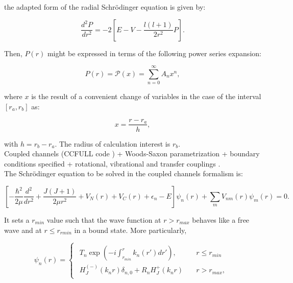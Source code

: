 \documentclass[openany]{book}
\begin{document}
the adapted form of the radial Schrödinger equation is given by:

\begin{equation}\label{eq:numericalSolver_radialSchrodinger_adapted}
		\frac{d^2P}{dr^2} = - 2 \left[E - V - \frac{l(l+1)}{2r^2}P\right]. 
\end{equation}

Then, $P(r)$ might be expressed in terms of the following power series expansion: 

\begin{equation}\label{eq:numericalSolver_radialSchrodinger_P}
	P(r) = \mathcal{P}(x) = \sum_{n=0}^{\infty} A_n x^n,
\end{equation}

where $x$ is the result of a convenient change of variables in the case of the interval $[r_a, r_b]$ as:

\begin{equation}\label{eq:numericalSolver_radialSchrodinger_P_x}
	x = \frac{r - r_a}{h},
\end{equation}

with $h = r_b - r_a$. The radius of calculation interest is $r_b$. \\

Coupled channels (CCFULL code ) + Woods-Saxon parametrization + boundary conditions specified + rotational, vibrational and transfer couplings \cite{hagino_rowley_kruppa_1999}. \\

The Schrödinger equation to be solved in the coupled channels formalism is:

\begin{equation}\label{eq:numericalSolver_coupledChannels}
	 \left[- \frac{\hbar^2}{2\mu} \frac{d^2}{dr^2} + \frac{J(J+1)}{2\mu r^2} + V_N(r) + V_C(r) + \epsilon_n - E \right] \psi_n(r) + \sum_{m} V_{nm}(r) \psi_m(r) = 0.
\end{equation}

 It sets a $r_{min}$ value such that the wave function at $r > r_{max}$ behaves like a free wave and at $r \le r_{rmin}$ in a bound state. More particularly, 

\begin{equation}\label{eq:numericalSolver_coupledChannels_waveFunction}
		\psi_n(r) = 	\left\{\begin{array}{l}
			\begin{split}
				T_n \exp {\left(- i \int^{r}_{r_{min}} {k_n(r')dr' }\right)}, \quad &r \le r_{min} \\ 
				H^{(-)}_J(k_nr) \delta_{n,0} + R_n H^{+}_{J}(k_nr) \quad &r > r_{max},
			\end{split}
		\end{array}\right.
\end{equation}
\end{document}
